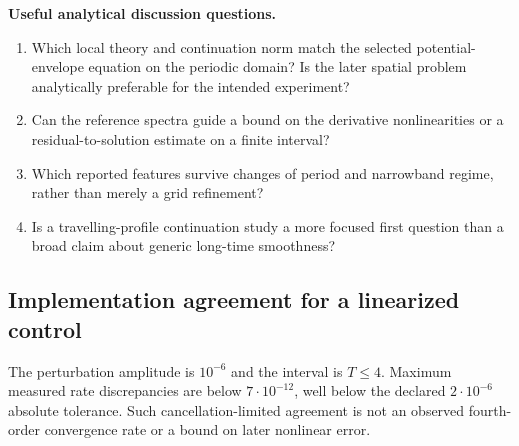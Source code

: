 \textbf{Useful analytical discussion questions.}
\begin{enumerate}
\item Which local theory and continuation norm match the selected potential-envelope equation on the periodic domain? Is the later spatial problem analytically preferable for the intended experiment?
\item Can the reference spectra guide a bound on the derivative nonlinearities or a residual-to-solution estimate on a finite interval?
\item Which reported features survive changes of period and narrowband regime, rather than merely a grid refinement?
\item Is a travelling-profile continuation study a more focused first question than a broad claim about generic long-time smoothness?
\end{enumerate}

\subsection{Implementation agreement for a linearized control}
The perturbation amplitude is $10^{-6}$ and the interval is $T\le4$. Maximum measured rate discrepancies are below $7\cdot10^{-12}$, well below the declared $2\cdot10^{-6}$ absolute tolerance. Such cancellation-limited agreement is not an observed fourth-order convergence rate or a bound on later nonlinear error.
